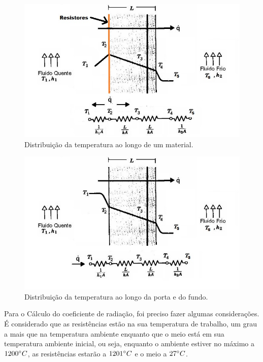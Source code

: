\begin{figure}[ht]
	\centering
	\label{dist_temperatura}
	\includegraphics[keepaspectratio=true,scale=0.5]{figuras/figura15.jpg}
	\caption{Distribuição da temperatura ao longo de um material.}
\end{figure}
\begin{figure}[ht]
	\centering
	\label{dist_temperatura}
	\includegraphics[keepaspectratio=true,scale=0.5]{figuras/figura16.jpg}
	\caption{Distribuição da temperatura ao longo da porta e do fundo.}
\end{figure}

Para o Cálculo do coeficiente de radiação, foi preciso fazer algumas considerações. É considerado que as resistências estão na sua temperatura de trabalho, um grau a mais que na temperatura ambiente enquanto que o meio está em sua temperatura ambiente inicial, ou seja, enquanto o ambiente estiver no máximo a $1200\degree C$, as resistências estarão a $1201\degree C$ e o meio a $27\degree C$.

